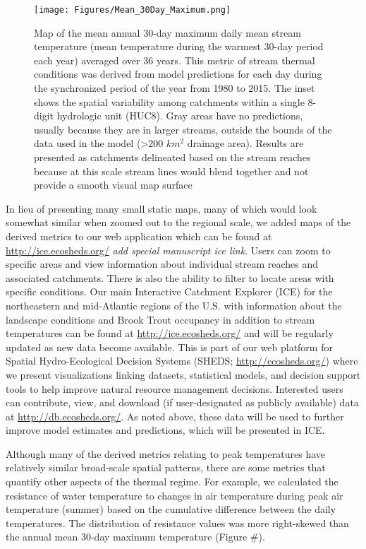 \begin{figure}[htbp]
\centering
\texttt{[image: Figures/Mean\_30Day\_Maximum.png]}
\caption{Map of the mean annual 30-day maximum daily mean stream
temperature (mean temperature during the warmest 30-day period each
year) averaged over 36 years. This metric of stream thermal conditions
was derived from model predictions for each day during the synchronized
period of the year from 1980 to 2015. The inset shows the spatial
variability among catchments within a single 8-digit hydrologic unit
(HUC8). Gray areas have no predictions, usually because they are in
larger streams, outside the bounds of the data used in the model
(\textgreater{}200 \(km^2\) drainage area). Results are presented as
catchments delineated based on the stream reaches because at this scale
stream lines would blend together and not provide a smooth visual map
surface}
\end{figure}

In lieu of presenting many small static maps, many of which would look
somewhat similar when zoomed out to the regional scale, we added maps of
the derived metrics to our web application which can be found at
\url{http://ice.ecosheds.org/} \emph{add special manuscript ice link}.
Users can zoom to specific areas and view information about individual
stream reaches and associated catchments. There is also the ability to
filter to locate areas with specific conditions. Our main Interactive
Catchment Explorer (ICE) for the northeastern and mid-Atlantic regions
of the U.S. with information about the landscape conditions and Brook
Trout occupancy in addition to stream temperatures can be found at
\url{http://ice.ecosheds.org/} and will be regularly updated as new data
become available. This is part of our web platform for Spatial
Hydro-Ecological Decision Systems (SHEDS; \url{http://ecosheds.org/})
where we present visualizations linking datasets, statistical models,
and decision support tools to help improve natural resource management
decisions. Interested users can contribute, view, and download (if
user-designated as publicly available) data at
\url{http://db.ecosheds.org/}. As noted above, these data will be used
to further improve model estimates and predictions, which will be
presented in ICE.

Although many of the derived metrics relating to peak temperatures have
relatively similar broad-scale spatial patterns, there are some metrics
that quantify other aspects of the thermal regime. For example, we
calculated the resistance of water temperature to changes in air
temperature during peak air temperature (summer) based on the cumulative
difference between the daily temperatures. The distribution of
resistance values was more right-skewed than the annual mean 30-day
maximum temperature (Figure \#).


